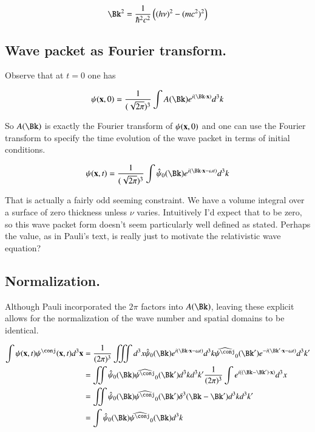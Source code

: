 \begin{align*}
\Bk^2 = \inv{\hbar^2 c^2 }\left( (h \nu)^2 - (m c^2)^2 \right)
\end{align*}

\subsection{Wave packet as Fourier transform. }

Observe that at $t=0$ one has

\begin{align*}
\psi(\Bx,0) = \inv{(\sqrt{2\pi})^3}\int A(\Bk) e^{ i (\Bk \cdot \Bx)} d^3 k
\end{align*}

So $A(\Bk)$ is exactly the Fourier transform of $\psi(\mathbf{x},0)$
and one can
use the Fourier transform to specify the time evolution of the wave packet in terms of initial conditions.

\begin{align}
\psi(\Bx,t) = \inv{(\sqrt{2\pi})^3}\int \hat{\psi}_0(\Bk) e^{ i (\Bk \cdot \Bx - \omega t)} d^3 k
\end{align}

That is actually a fairly odd seeming constraint.  We have a volume integral over a surface of zero thickness unless $\nu$ varies.  Intuitively
I'd expect that to be zero, so this wave packet form doesn't seem particularly well defined as stated.  Perhaps the value, as
in Pauli's text, is really just to motivate the relativistic wave equation?

\subsection{Normalization. }

Although Pauli incorporated the $2\pi$ factors into $A(\Bk)$, leaving these explicit allows for the normalization of the wave number and spatial domains
to be identical.

\begin{align*}
\int
\psi(\Bx,t) \psi^\conj(\Bx,t) d^3 \Bx
&=
\inv{({2\pi})^3}
\iiint d^3 x
\hat{\psi}_0(\Bk) e^{ i (\Bk \cdot \Bx - \omega t)} d^3 k
\widehat{\psi^\conj}_0(\Bk') e^{ -i (\Bk' \cdot \Bx - \omega t)} d^3 k'
\\
&=
\iint \hat{\psi}_0(\Bk) \widehat{\psi^\conj}_0(\Bk')
d^3 k d^3 k'
\inv{({2\pi})^3} \int e^{ i ((\Bk- \Bk') \cdot \Bx)} d^3 x
\\
&=
\iint \hat{\psi}_0(\Bk) \widehat{\psi^\conj}_0(\Bk') \delta^3(\Bk-\Bk') d^3 k d^3 k'
\\
&=
\int \hat{\psi}_0(\Bk) \widehat{\psi^\conj}_0(\Bk) d^3 k
\\
\end{align*}

